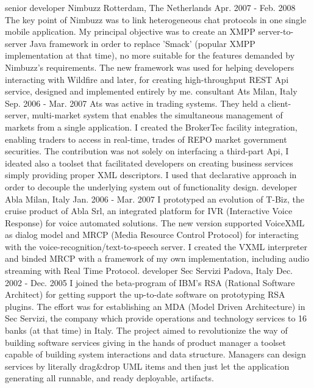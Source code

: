 \begin{cventries}
\cventry
  {senior developer} %
  {Nimbuzz} %
  {Rotterdam, The Netherlands} %
  {Apr. 2007 - Feb. 2008} %
  {
    The key point of Nimbuzz was to link heterogeneous chat protocols in one single mobile application.
    My principal objective was to create an XMPP server-to-server Java framework in order to replace 'Smack' (popular XMPP implementation at that time),
    no more suitable for the features demanded by Nimbuzz's requirements. The new framework was used for helping developers interacting with Wildfire and later,
    for creating high-throughput REST Api service, designed and implemented entirely by me.
  }
\cventry
  {consultant} %
  {Ats} %
  {Milan, Italy} %
  {Sep. 2006 - Mar. 2007} %
  {
    Ats was active in trading systems. They held a client-server, multi-market system that enables the simultaneous management of markets from a single application.
    I created the BrokerTec facility integration, enabling traders to access in real-time, trades of REPO market government securities.
    The contribution was not solely on interfacing a third-part Api, I ideated also a toolset that facilitated developers on creating business services
    simply providing proper XML descriptors. I used that declarative approach in order to decouple the underlying system out of functionality design.
  }
\cventry
  {developer} %
  {Abla} %
  {Milan, Italy} %
  {Jan. 2006 - Mar. 2007} %
  {
    I prototyped an evolution of T-Biz, the cruise product of Abla Srl, an integrated platform for IVR (Interactive Voice Response)
    for voice automated solutions. The new version supported VoiceXML as dialog model and MRCP (Media Resource Control Protocol)
    for interacting with the voice-recognition/text-to-speech server. I created the VXML interpreter and binded MRCP with a framework
    of my own implementation, including audio streaming with Real Time Protocol.
  }
\cventry
  {developer} %
  {Sec Servizi} %
  {Padova, Italy} %
  {Dec. 2002 - Dec. 2005} %
  {
    I joined the beta-program of IBM's RSA (Rational Software Architect) for getting support the up-to-date software on prototyping RSA plugins. The effort was for establishing an MDA (Model Driven Architecture) in Sec Servizi, the company which provide
    operations and technology services to 16 banks (at that time) in Italy.
    The project aimed to revolutionize the way of building software services giving in the hands of product manager a toolset capable of building system interactions and data structure. Managers can design services by literally drag\&drop UML items
    and then just let the application generating all runnable, and ready deployable, artifacts.
  }

\end{cventries}
